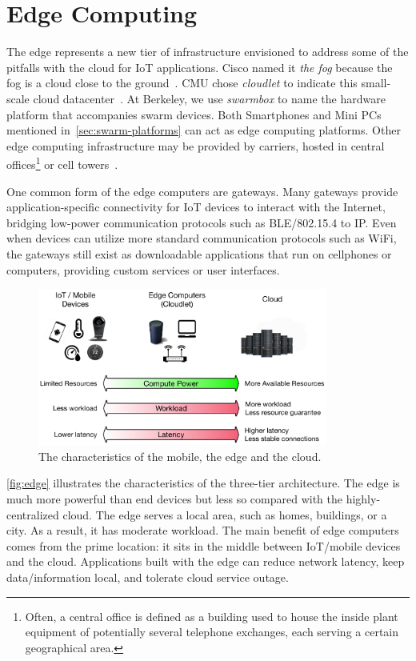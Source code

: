 \section{Edge Computing}
\label{sec:edge-computing}

The edge represents a new tier of infrastructure envisioned to address some of
the pitfalls with the cloud for IoT applications. Cisco named it \textit{the
  fog} because the fog is a cloud close to the ground~\cite{bonomi2012fog}. CMU
chose \textit{cloudlet} to indicate this small-scale cloud
datacenter~\cite{ha2014towards, satyanarayanan2009case}. At Berkeley, we use
\textit{swarmbox} to name the hardware platform that accompanies swarm
devices. Both Smartphones and Mini PCs mentioned
in~\autoref{sec:swarm-platforms} can act as edge computing platforms. Other edge
computing infrastructure may be provided by carriers, hosted in central
offices\footnote{Often, a central office is defined as a building used to house
  the inside plant equipment of potentially several telephone exchanges, each
  serving a certain geographical area.} or cell towers~\cite{att2017edge}.

One common form of the edge computers are gateways. Many gateways provide
application-specific connectivity for IoT devices to interact with the Internet,
bridging low-power communication protocols such as BLE/802.15.4 to IP. Even when
devices can utilize more standard communication protocols such as WiFi, the
gateways still exist as downloadable applications that run on cellphones or
computers, providing custom services or user interfaces.

\begin{figure}
  \centering
  \includegraphics[width=0.85\textwidth]{figures/background.pdf}
  \caption{The characteristics of the mobile, the edge and the cloud.}
  \label{fig:edge}
\end{figure}

\autoref{fig:edge} illustrates the characteristics of the three-tier
architecture. The edge is much more powerful than end devices but less so
compared with the highly-centralized cloud. The edge serves a local area, such
as homes, buildings, or a city. As a result, it has moderate workload. The main
benefit of edge computers comes from the prime location: it sits in the middle
between IoT/mobile devices and the cloud. Applications built with the edge can
reduce network latency, keep data/information local, and tolerate cloud service
outage.

